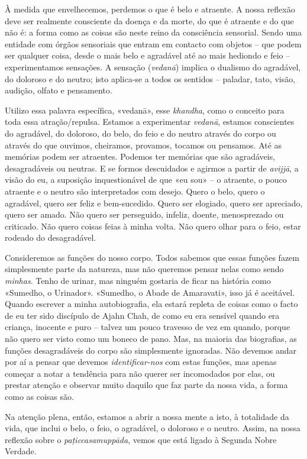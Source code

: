 À medida que envelhecemos, perdemos o que é belo e atraente. A nossa reflexão
deve ser realmente consciente da doença e da morte, do que é atraente e do que
não é: a forma como as coisas são neste reino da consciência sensorial. Sendo
uma entidade com órgãos sensoriais que entram em contacto com objetos -- que
podem ser qualquer coisa, desde o mais belo e agradável até ao mais hediondo e
feio -- experimentamos sensações. A sensação (\emph{vedanā}) implica o dualismo
do agradável, do doloroso e do neutro; isto aplica-se a todos os sentidos --
paladar, tato, visão, audição, olfato e pensamento.

Utilizo essa palavra específica, «vedanā», esse \emph{khandha}, como o conceito
para toda essa atração/repulsa. Estamos a experimentar \emph{vedanā}, estamos
conscientes do agradável, do doloroso, do belo, do feio e do neutro através do
corpo ou através do que ouvimos, cheiramos, provamos, tocamos ou pensamos. Até
as memórias podem ser atraentes. Podemos ter memórias que são agradáveis,
desagradáveis ou neutras. E se formos descuidados e agirmos a partir de
\emph{avijjā}, a visão do eu, a suposição inquestionável de que «eu sou» -- o
atraente, o pouco atraente e o neutro são interpretados com desejo. Quero o
belo, quero o agradável, quero ser feliz e bem-sucedido. Quero ser elogiado,
quero ser apreciado, quero ser amado. Não quero ser perseguido, infeliz, doente,
menosprezado ou criticado. Não quero coisas feias à minha volta. Não quero olhar
para o feio, estar rodeado do desagradável.

Consideremos as funções do nosso corpo. Todos sabemos que essas funções fazem
simplesmente parte da natureza, mas não queremos pensar nelas como sendo
\emph{minhas}. Tenho de urinar, mas ninguém gostaria de ficar na história como
«Sumedho, o Urinador». «Sumedho, o Abade de Amaravati», isso já é aceitável.
Quando escrever a minha autobiografia, ela estará repleta de coisas como o facto
de eu ter sido discípulo de Ajahn Chah, de como eu era sensível quando era
criança, inocente e puro -- talvez um pouco travesso de vez em quando, porque
não quero ser visto como um boneco de pano. Mas, na maioria das biografias, as
funções desagradáveis do corpo são simplesmente ignoradas. Não devemos andar por
aí a pensar que devemos \emph{identificar-nos} com estas funções, mas apenas
começar a notar a tendência para não querer ser incomodados por elas, ou prestar
atenção e observar muito daquilo que faz parte da nossa vida, a forma como as
coisas são.

Na atenção plena, então, estamos a abrir a nossa mente a isto, à totalidade da
vida, que inclui o belo, o feio, o agradável, o doloroso e o neutro. Assim, na
nossa reflexão sobre o \emph{paṭiccasamuppāda}, vemos que está ligado à Segunda
Nobre Verdade.

